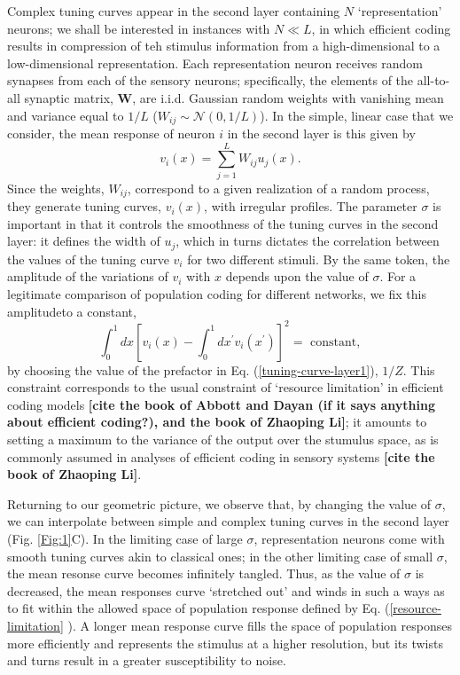 \documentclass[a4paper]{article}%
\begin{document}
Complex tuning curves appear in the second layer containing $N$
`representation' neurons; we shall be interested in instances with $N\ll L$,
in which efficient coding results in compression of teh stimulus information
from a high-dimensional to a low-dimensional representation. Each
representation neuron receives random synapses from each of the sensory
neurons; specifically, the elements of the all-to-all synaptic matrix,
$\mathbf{W}$, are i.i.d. Gaussian random weights with vanishing mean and
variance equal to $1/L$ ($W_{ij}\sim\mathcal{N}\left(  0,1/L\right)  $). In
the simple, linear case that we consider, the mean response of neuron $i$ in
the second layer is this given by
\begin{equation}
v_{i}\left(  x\right)  =\sum_{j=1}^{L}W_{ij}u_{j}\left(  x\right)  .
\end{equation}
Since the weights, $W_{ij}$, correspond to a given realization of a random
process, they generate tuning curves, $v_{i}\left(  x\right)  $, with
irregular profiles. The parameter $\sigma$ is important in that it controls
the smoothness of the tuning curves in the second layer: it defines the width
of $u_{j}$, which in turns dictates the correlation between the values of the
tuning curve $v_{i}$ for two different stimuli. By the same token, the
amplitude of the variations of $v_{i}$ with $x$ depends upon the value of
$\sigma$. For a legitimate comparison of population coding for different
networks, we fix this amplitudeto a constant,%
\begin{equation}
\int_{0}^{1}dx\left[  v_{i}\left(  x\right)  -\int_{0}^{1}dx^{\prime}%
v_{i}\left(  x^{\prime}\right)  \right]  ^{2}=\text{ constant}%
,\label{resource-limitation}%
\end{equation}
by choosing the value of the prefactor in Eq. (\ref{tuning-curve-layer1}),
$1/Z$. This constraint corresponds to the usual constraint of `resource
limitation' in efficient coding models \textbf{[cite the book of Abbott and
Dayan (if it says anything about efficient coding?), and the book of Zhaoping
Li]}; it amounts to setting a maximum to the variance of the output over the
stumulus space, as is commonly assumed in analyses of efficient coding in
sensory systems \textbf{[cite the book of Zhaoping Li]}.

Returning to our geometric picture, we observe that, by changing the value of
$\sigma$, we can interpolate between simple and complex tuning curves in the
second layer (Fig. \ref{Fig:1}C). In the limiting case of large $\sigma$,
representation neurons come with smooth tuning curves akin to classical ones;
in the other limiting case of small $\sigma$, the mean resonse curve becomes
infinitely tangled. Thus, as the value of $\sigma$ is decreased, the mean
responses curve `stretched out' and winds in such a ways as to fit within the
allowed space of population response defined by Eq. (\ref{resource-limitation}%
). A longer mean response curve fills the space of population responses more
efficiently and represents the stimulus at a higher resolution, but its twists
and turns result in a greater susceptibility to noise.
\end{document}
